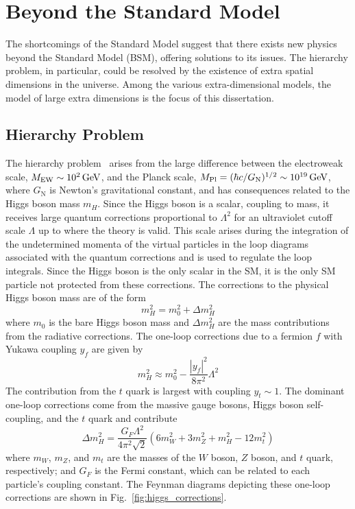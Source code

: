 \section{Beyond the Standard Model}

The shortcomings of the Standard Model suggest that there exists new physics beyond the Standard Model (BSM), offering solutions to its issues. The hierarchy problem, in particular, could be resolved by the existence of extra spatial dimensions in the universe. Among the various extra-dimensional models, the model of large extra dimensions is the focus of this dissertation.

\subsection{Hierarchy Problem}

The hierarchy problem~\cite{hp1,hp2} arises from the large difference between the electroweak scale, $M_{\mathrm{EW}} \sim 10^2\,\text{Ge\hspace{-.08em}V}$, and the Planck scale, ${M_\mathrm{Pl}} = (\hbar c/G_{\mathrm{N}})^{1/2} \sim 10^{19}\,\text{Ge\hspace{-.08em}V}$, where $G_{\mathrm{N}}$ is Newton's gravitational constant, and has consequences related to the Higgs boson mass $m_H$. Since the Higgs boson is a scalar, coupling to mass, it receives large quantum corrections proportional to $\Lambda^2$ for an ultraviolet cutoff scale $\Lambda$ up to where the theory is valid. This scale arises during the integration of the undetermined momenta of the virtual particles in the loop diagrams associated with the quantum corrections and is used to regulate the loop integrals. Since the Higgs boson is the only scalar in the SM, it is the only SM particle not protected from these corrections. The corrections to the physical Higgs boson mass are of the form
\begin{equation}
	m_H^2 = m_0^2 + \Delta m_H^2
\end{equation}
where $m_0$ is the bare Higgs boson mass and $\Delta m_H^2$ are the mass contributions from the radiative corrections. The one-loop corrections due to a fermion $f$ with Yukawa coupling $y_f$ are given by
\begin{equation}
	m_H^2 \approx m_0^2 - \frac{|y_f|^2}{8\pi^2}\Lambda^2
\end{equation}
The contribution from the $t$ quark is largest with coupling $y_t \sim 1$. The dominant one-loop corrections come from the massive gauge bosons, Higgs boson self-coupling, and the $t$ quark and contribute~\cite{Quigg:2013ufa}
\begin{equation}
	\Delta m_H^2 = \frac{G_F \Lambda^2}{4 \pi^2 \sqrt{2}} (6m_W^2 + 3m_Z^2 + m_H^2 - 12m_t^2)
\end{equation}
where $m_W$, $m_Z$, and $m_t$ are the masses of the $W$ boson, $Z$ boson, and $t$ quark, respectively; and $G_F$ is the Fermi constant, which can be related to each particle's coupling constant. The Feynman diagrams depicting these one-loop corrections are shown in Fig.~\ref{fig:higgs_corrections}.  

